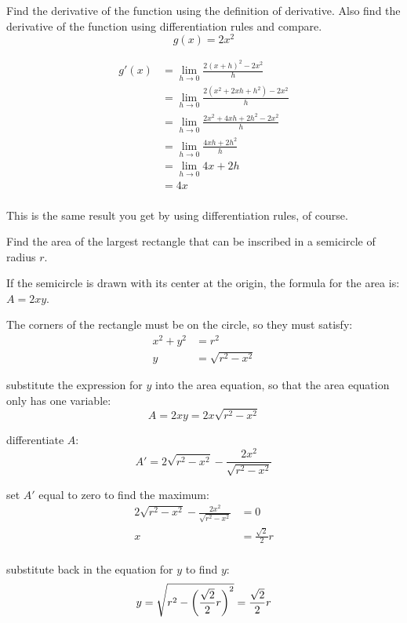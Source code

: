 \documentclass[fleqn,addpoints]{exam}
\begin{document}
\begin{questions}
\question Find the derivative of the function using the definition of derivative. Also find the derivative of the
function using differentiation rules and compare.  
\[
  g(x) = 2x^2
\]

\begin{solution}
\begin{align*}
  g'(x) &= \lim_{h \to 0} \frac{2 (x + h)^2 - 2x^2}{h} \\
  &= \lim_{h \to 0} \frac{2 (x^2 + 2xh + h^2) - 2x^2}{h} \\
  &= \lim_{h \to 0} \frac{2x^2 + 4xh + 2h^2 - 2x^2}{h} \\
  &= \lim_{h \to 0} \frac{4xh + 2h^2}{h} \\
  &= \lim_{h \to 0} 4x + 2h \\
  &= 4x \\
\end{align*}

This is the same result you get by using differentiation rules, of course.

\end{solution}

\question
Find the area of the largest rectangle that can be inscribed in a semicircle of radius $r$.

\begin{solution}
If the semicircle is drawn with its center at the origin, the formula for the area is: $A = 2xy$.

The corners of the rectangle must be on the circle, so they must satisfy:
\begin{align*}
  x^2 + y^2 &= r^2 \\
  y &= \sqrt{r^2 - x^2}
\end{align*}

substitute the expression for $y$ into the area equation, so that the area equation only has one variable:
\[
  A = 2xy = 2x \sqrt{r^2 - x^2}
\]

differentiate $A$:
\[
  A' = 2 \sqrt{r^2 - x^2} - \frac{2x^2}{\sqrt{r^2 - x^2}} 
\]

set $A'$ equal to zero to find the maximum:
\begin{align*}
  2 \sqrt{r^2 - x^2} - \frac{2x^2}{\sqrt{r^2 - x^2}} &= 0 \\
  x &= \frac{\sqrt{2}}{2} r \\
\end{align*}

substitute back in the equation for $y$ to find $y$:
\[
  y = \sqrt{r^2 - \left( \frac{\sqrt{2}}{2} r \right)^2} = \frac{\sqrt{2}}{2} r \\
\]


\end{solution}
\end{questions}
\end{document}
